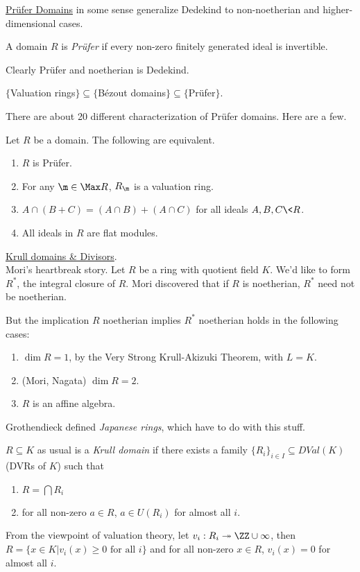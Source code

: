  \underline{Pr\"ufer Domains} in some sense generalize Dedekind to non-noetherian and
 higher-dimensional cases.
 \begin{definition}
   A domain $R$ is \emph{Pr\"ufer} if every non-zero finitely generated ideal is
   invertible.
 \end{definition}
 Clearly Pr\"ufer and noetherian is Dedekind.
 \begin{example}
   $\{$Valuation rings$\}\subseteq \{$B\'ezout
     domains$\}\subseteq\{$Pr\"ufer$\}$.
 \end{example}
 There are about 20 different characterization of Pr\"ufer domains. Here are a few.
 \begin{theorem}
   Let $R$ be a domain. The following are equivalent.
   \begin{enumerate}
     \item $R$ is Pr\"ufer.
     \item For any $\m\in \Max R$, $R_\m$ is a valuation ring.
     \item $A\cap (B+C)=(A\cap B)+(A\cap C)$ for all ideals $A,B,C\< R$.
     \item All ideals in $R$ are flat modules.
   \end{enumerate}
 \end{theorem}

 \underline{Krull domains \& Divisors}.\\
 Mori's heartbreak story. Let $R$ be a ring with quotient field $K$. We'd like to form
 $R^*$, the integral closure of $R$. Mori discovered that if $R$ is noetherian, $R^*$
 need not be noetherian.

 But the implication $R$ noetherian implies $R^*$ noetherian holds in the following
 cases:
 \begin{enumerate}
   \item $\dim R=1$, by the Very Strong Krull-Akizuki Theorem, with $L=K$.
   \item (Mori, Nagata) $\dim R=2$.
   \item $R$ is an affine algebra.
 \end{enumerate}
 Grothendieck defined \emph{Japanese rings}, which have to do with this stuff.
 \begin{definition}
   $R\subseteq K$ as usual is a \emph{Krull domain} if there exists a family
   $\{R_i\}_{i\in I}\subseteq DVal(K)$ (DVRs of $K$) such that
   \begin{enumerate}
     \item $R = \bigcap R_i$
     \item for all non-zero $a\in R$, $a\in U(R_i)$ for almost all $i$.
   \end{enumerate}
 \end{definition}
 From the viewpoint of valuation theory, let $v_i:R_i\twoheadrightarrow \ZZ\cup \infty$,
 then $R=\{x\in K|v_i(x)\ge 0 \text{ for all }i\}$ and for all non-zero $x\in R$,
 $v_i(x)=0$ for almost all $i$.

